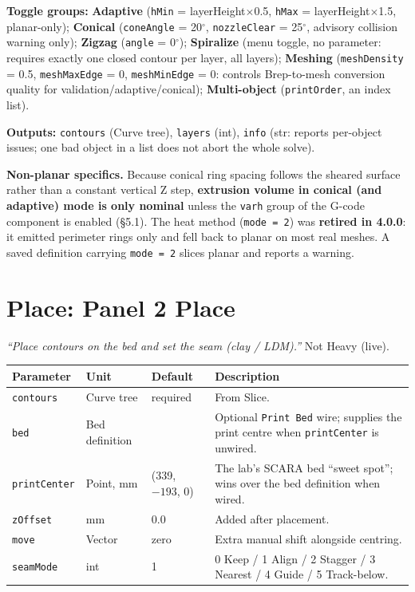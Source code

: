 \documentclass[11pt]{article}
\newcommand{\param}[1]{\texttt{#1}}
\newcommand{\iamdeg}{$^{\circ}$}
\begin{document}
\textbf{Toggle groups:}
\textbf{Adaptive} (\param{hMin} = layerHeight$\times$0.5, \param{hMax} =
layerHeight$\times$1.5, planar-only); \textbf{Conical} (\param{coneAngle} = 20\iamdeg, \param{nozzleClear} =
25\iamdeg, advisory collision warning only); \textbf{Zigzag} (\param{angle} = 0\iamdeg); \textbf{Spiralize} (menu toggle, no parameter: requires exactly one
closed contour per layer, all layers); \textbf{Meshing} (\param{meshDensity} = 0.5, \param{meshMaxEdge} = 0,
\param{meshMinEdge} = 0: controls Brep-to-mesh conversion quality for
validation/adaptive/conical); \textbf{Multi-object} (\param{printOrder}, an index list).

\textbf{Outputs:} \param{contours} (Curve tree), \param{layers} (int),
\param{info} (str: reports per-object issues; one bad object in a
list does not abort the whole solve).

\textbf{Non-planar specifics.} Because conical ring spacing follows the
sheared surface rather than a constant vertical Z step,
\textbf{extrusion volume in conical (and adaptive) mode is only
nominal} unless the \param{varh} group of the G-code component is
enabled (\S 5.1). The heat method (\param{mode = 2}) was
\textbf{retired in 4.0.0}: it emitted perimeter rings only and fell
back to planar on most real meshes. A saved definition carrying
\param{mode = 2} slices planar and reports a warning.

\section{Place: Panel 2 Place}

\emph{``Place contours on the bed and set the seam (clay / LDM).''} Not
Heavy (live).

\begin{longtable}{@{}p{3.0cm}p{2.0cm}p{2.2cm}p{6.4cm}@{}}
\toprule
\textbf{Parameter} & \textbf{Unit} & \textbf{Default} & \textbf{Description} \\
\midrule
\endhead
\param{contours} & Curve tree & required & From Slice. \\
\param{bed} & Bed definition & & Optional \param{Print Bed} wire; supplies the print centre when \param{printCenter} is unwired. \\
\param{printCenter} & Point, mm & (339, $-193$, 0) & The lab's SCARA bed ``sweet spot''; wins over the bed definition when wired. \\
\param{zOffset} & mm & 0.0 & Added after placement. \\
\param{move} & Vector & zero & Extra manual shift alongside centring. \\
\param{seamMode} & int & 1 & 0 Keep / 1 Align / 2 Stagger / 3 Nearest / 4 Guide / 5 Track-below. \\
\bottomrule
\end{longtable}
\end{document}
